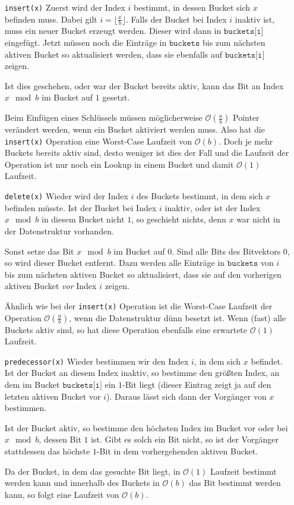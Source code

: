 \begin{itemize}[leftmargin=3cm]
    \item[\texttt{insert(x)}] 
    Zuerst wird der Index $i$ bestimmt, in dessen Bucket sich $x$ befinden muss. Dabei gilt $i = \lfloor \tfrac{x}{b} \rfloor$. Falls der Bucket bei Index $i$ inaktiv ist, muss ein neuer Bucket erzeugt werden. Dieser wird dann in $\texttt{buckets[i]}$ eingefügt.
    Jetzt müssen noch die Einträge in $\texttt{buckets}$ bis zum nächsten aktiven Bucket so aktualisiert werden, dass sie ebenfalls auf $\texttt{buckets[i]}$ zeigen.
    
    Ist dies geschehen, oder war der Bucket bereits aktiv, kann das Bit an Index $x \mod b$ im Bucket auf $1$ gesetzt.
    
    Beim Einfügen eines Schlüssels müssen möglicherweise $\mathcal{O}(\tfrac{u}{b})$ Pointer verändert werden, wenn ein Bucket aktiviert werden muss. Also hat die \texttt{insert(x)} Operation eine Worst-Case Laufzeit von $\mathcal{O}(b)$. Doch je mehr Buckets bereits aktiv sind, desto weniger ist dies der Fall und die Laufzeit der Operation ist nur noch ein Lookup in einem Bucket und damit $\mathcal{O}(1)$ Laufzeit.

    \item[\texttt{delete(x)}]
    Wieder wird der Index $i$ des Buckets bestimmt, in dem sich $x$ befinden müsste. Ist der Bucket bei Index $i$ inaktiv, oder ist der Index $x \mod b$ in diesem Bucket nicht $1$, so geschieht nichts, denn $x$ war nicht in der Datenstruktur vorhanden.

    Sonst setze das Bit $x \mod b$ im Bucket auf $0$. Sind alle Bits des Bitvektors $0$, so wird dieser Bucket entfernt. Dazu werden alle Einträge in $\texttt{buckets}$ von $i$ bis zum nächsten aktiven Bucket so aktualisiert, dass sie auf den vorherigen aktiven Bucket \textit{vor} Index $i$ zeigen.

    Ähnlich wie bei der \texttt{insert(x)} Operation ist die Worst-Case Laufzeit der Operation $\mathcal{O}(\tfrac{u}{b})$, wenn die Datenstruktur dünn besetzt ist. Wenn (fast) alle Buckets aktiv sind, so hat diese Operation ebenfalls eine erwartete $\mathcal{O}(1)$ Laufzeit.

    \item[\texttt{predecessor(x)}]
    Wieder bestimmen wir den Index $i$, in dem sich $x$ befindet. Ist der Bucket an diesem Index inaktiv, so bestimme den größten Index, an dem im Bucket $\texttt{buckets[i]}$ ein $1$-Bit liegt (dieser Eintrag zeigt ja auf den letzten aktiven Bucket vor $i$). Daraus lässt sich dann der Vorgänger von $x$ bestimmen.

    Ist der Bucket aktiv, so bestimme den höchsten Index im Bucket vor oder bei $x \mod b$, dessen Bit $1$ ist. Gibt es solch ein Bit nicht, so ist der Vorgänger stattdessen das höchste $1$-Bit in dem vorhergehenden aktiven Bucket.

    Da der Bucket, in dem das gesuchte Bit liegt, in $\mathcal{O}(1)$ Laufzeit bestimmt werden kann und innerhalb des Buckets in $\mathcal{O}(b)$ das Bit bestimmt werden kann, so folgt eine Laufzeit von $\mathcal{O}(b)$.
\end{itemize}

